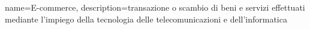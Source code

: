 {
	name={E-commerce},
	description={transazione o scambio di beni e servizi effettuati mediante l'impiego della tecnologia delle telecomunicazioni e dell'informatica}
}